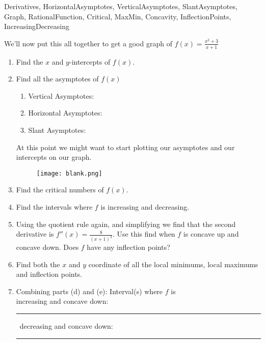 \begin{tagblock}{Derivatives, HorizontalAsymptotes, VerticalAsymptotes, SlantAsymptotes, Graph, RationalFunction, Critical, MaxMin, Concavity, InflectionPoints, IncreasingDecreasing  }
\begin{question}


We'll now put this all together to get a good graph of $\displaystyle f(x) = \frac{x^2+3}{x+1}$
\begin{enumerate}
\item Find the $x$ and $y$-intercepts of $f(x)$.

\vspace{.75in}
\item Find all the asymptotes of $f(x)$
\begin{enumerate}
\item Vertical Asymptotes:
\item Horizontal Asymptotes:
\item Slant Asymptotes:
\end{enumerate}
At this point we might want to start plotting our asymptotes and our intercepts on our graph.

\begin{figure}[h]
\centering
\texttt{[image: blank.png]} 
\end{figure}




\item Find the critical numbers of $f(x)$.





\newpage
\item Find the intervals where $f$ is increasing and decreasing.
\vspace{2in}

\item Using the quotient rule again, and simplifying we find that the second derivative is $f''(x) = \frac{8}{(x+1)^3}$.  Use this find when $f$ is concave up and concave down.  Does $f$ have any inflection points?

\vspace{1.5in}

\item Find both the $x$ and $y$ coordinate of all the local minimums, local maximums and inflection points.  

\vspace{1.5in}
\item Combining parts (d) and (e):  
Interval(s) where $f$ is \\
increasing and concave down:   \rule{2cm}{0.1mm} \, decreasing and concave down:   \rule{2cm}{0.1mm} \\
\bigskip


\end{enumerate}
\end{question}
\end{tagblock}
